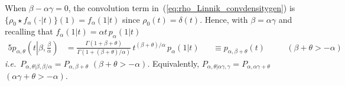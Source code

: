 \documentclass[a4paper,12pt]{article}
\begin{document}
{{{When $\beta-\alpha\gamma=0$, the convolution term in~(\ref{eq:rho_Linnik_convdensitygen}) is
$\{\rho_0\star f_\alpha(\cdot\vert  t)\}(1)= f_\alpha(1\vert  t)$ since  $\rho_0(t)=\delta(t)$.
Hence, with $\beta=\alpha\gamma$ and  recalling that $f_\alpha(1\vert  t) = \alpha t \, p_\alpha(1\vert  t)$
\begin{alignat}{5}
p_{\alpha,\theta}\left(t \left. \right\vert \beta,\tfrac{\beta}{\alpha}\right) 
&= \frac{\Gamma(1+\beta+\theta)}{\Gamma\left(1+(\beta+\theta)/\alpha\right)} \, 
t^{(\beta+\theta)/\alpha} \, p_\alpha(1\vert  t)  &&\equiv p_{\alpha,\beta+\theta}(t) \quad &&(\beta+\theta>-\alpha) 
\label{eq:ML4par_identity}
\end{alignat}
{\it i.e.}\ $P_{\alpha,\theta\vert\beta,\beta/\alpha} = P_{\alpha,\beta+\theta}$ $(\beta+\theta>-\alpha)$.
Equivalently, $P_{\alpha,\theta \vert\alpha\gamma,\gamma} = P_{\alpha,\alpha\gamma+\theta}$  $(\alpha\gamma+\theta>-\alpha)$.


}}}
\end{document}
